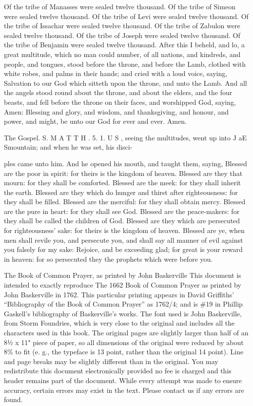 Of the tribe of Manasses were sealed twelve thousand. Of the tribe of Simeon were sealed twelve thousand. Of the tribe of Levi were sealed twelve thousand. Of the tribe of Issachar were sealed twelve thousand. Of the tribe of Zabulon were sealed twelve thousand. Of the tribe of Joseph were sealed twelve thousand. Of the tribe of Benjamin were sealed twelve thousand. After this I beheld, and lo, a great multitude, which no man could number, of all nations, and kindreds, and people, and tongues, stood before the throne, and before the Lamb, clothed with white robes, and palms in their hands; and cried with a loud voice, saying, Salvation to our God which sitteth upon the throne, and unto the Lamb. And all the angels stood round about the throne, and about the elders, and the four beasts, and fell before the throne on their faces, and worshipped God, saying, Amen: Blessing and glory, and wisdom, and thanksgiving, and honour, and power, and might, be unto our God for ever and ever. Amen.

The Gospel. S. M A T T H . 5. 1. U S , seeing the multitudes, went up into J aE Smountain; and when he was set, his disci-

ples came unto him. And he opened his mouth, and taught them, saying, Blessed are the poor in spirit: for theirs is the kingdom of heaven. Blessed are they that mourn: for they shall be comforted. Blessed are the meek: for they shall inherit the earth. Blessed are they which do hunger and thirst after righteousness: for they shall be filled. Blessed are the merciful: for they shall obtain mercy. Blessed are the pure in heart: for they shall see God. Blessed are the peace-makers: for they shall be called the children of God. Blessed are they which are persecuted for righteousness' sake: for theirs is the kingdom of heaven. Blessed are ye, when men shall revile you, and persecute you, and shall say all manner of evil against you falsely for my sake: Rejoice, and be exceeding glad; for great is your reward in heaven: for so persecuted they the prophets which were before you.


The Book of Common Prayer, as printed by John Baskerville This document is intended to exactly reproduce The 1662 Book of Common Prayer as printed by John Baskerville in 1762. This particular printing appears in David Griffiths' “Bibliography of the Book of Common Prayer” as 1762/4; and is \#19 in Phillip Gaskell's bibliography of Baskerville's works. The font used is John Baskerville, from Storm Foundries, which is very close to the original and includes all the characters used in this book. The original pages are slightly larger than half of an 8½ x 11" piece of paper, so all dimensions of the original were reduced by about 8\% to fit (e. g., the typeface is 13 point, rather than the original 14 point). Line and page breaks may be slightly different than in the original. You may redistribute this document electronically provided no fee is charged and this header remains part of the document. While every attempt was made to ensure accuracy, certain errors may exist in the text. Please contact us if any errors are found.

